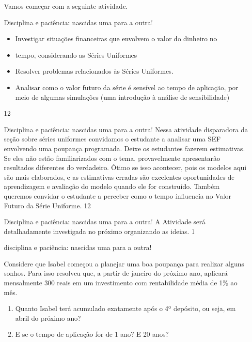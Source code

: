 Vamos começar com a seguinte atividade.
\clearpage
\begin{objectives}{Disciplina e paciência: nascidas uma para a outra!}
{
\begin{itemize}
\item Investigar situações financeiras que envolvem o valor do dinheiro no \item tempo, considerando as Séries Uniformes
\item Resolver problemas relacionados às Séries Uniformes.
\item Analisar como o valor futuro da série é sensível ao tempo de aplicação, por meio de algumas simulações (uma introdução à análise de sensibilidade)
\end{itemize}
}{1}{2}
\end{objectives}
\begin{sugestions}{Disciplina e paciência: nascidas uma para a outra!}
{
Nessa atividade disparadora da seção sobre séries uniformes convidamos o estudante a analisar uma SEF envolvendo uma poupança programada. Deixe os estudantes fazerem estimativas. Se eles não estão familiarizados com o tema, provavelmente apresentarão resultados diferentes do verdadeiro. Ótimo se isso acontecer, pois os modelos aqui são mais elaborados, e as estimativas erradas são excelentes oportunidades de aprendizagem e avaliação do modelo quando ele for construído.
Também queremos convidar o estudante a perceber como o tempo influencia no Valor Futuro da Série Uniforme. 
}{1}{2}
\end{sugestions}
\begin{answer}{Disciplina e paciência: nascidas uma para a outra!}
{
A Atividade será detalhadamente investigada no próximo organizando as ideias.
}{1}
\end{answer}

\begin{task}{disciplina e paciência: nascidas uma para a outra!}

Considere que Isabel começou a planejar uma boa poupança para realizar alguns sonhos. Para isso resolveu que, a partir de janeiro do próximo ano, aplicará mensalmente 300 reais em um investimento com rentabilidade média de 1\% ao mês. 

\begin{enumerate}
\item Quanto Isabel terá acumulado exatamente após o 4º depósito, ou seja, em abril do próximo ano?
\item E se o tempo de aplicação for de 1 ano? E 20 anos?
\end{enumerate} 

\end{task}


